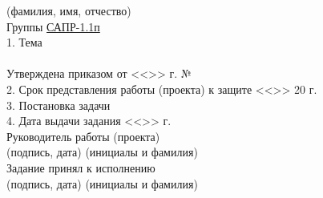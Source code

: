 \begin{titlepage}
\begin{flushleft}
            \vspace{-0.2cm}\hspace{5cm}\footnotesize(фамилия, имя, отчество)\normalsize\\
        Группы \underline{\hspace{1cm}САПР-1.1п\hspace{2cm}}\\
        1. Тема \underline{\hspace{15.2cm}}\\
        \underline{\hspace{\textwidth}}\\
        Утверждена приказом от <<\underline{\hspace{1cm}}>> \underline{\hspace{4cm}}
            \the\year г. № \underline{\hspace{3.6cm}}\\
        2. Срок представления работы (проекта) к защите
            <<\underline{\hspace{1cm}}>> \underline{\hspace{2.8cm}} 20\underline{\hspace{0.5cm}} г.\\
        3. Постановка задачи\\
        \underline{\hspace{\textwidth}}
        \underline{\hspace{\textwidth}}
        \underline{\hspace{\textwidth}}
        4. Дата выдачи задания <<\underline{\hspace{1cm}}>> \underline{\hspace{4cm}} \the\year г.\\
        Руководитель работы (проекта) \underline{\hspace{5cm}}
            \hspace{0.5cm} \underline{\hspace{4.2cm}}\\
            \vspace{-0.2cm}\hspace{8cm}\footnotesize(подпись, дата)
            \hspace{3cm}(инициалы и фамилия)\normalsize\\
        Задание принял к исполнению \hspace{0.2cm}\underline{\hspace{5cm}}
            \hspace{0.5cm} \underline{\hspace{4.2cm}}\\
            \vspace{-0.2cm}\hspace{8cm}\footnotesize(подпись, дата)
            \hspace{3cm}(инициалы и фамилия)\normalsize\\
    \end{flushleft}
\end{titlepage}
\setcounter{page}{3}
